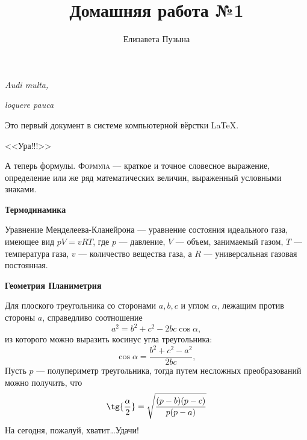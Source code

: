 \documentclass[12pt]{article}
\title{Домашняя работа №1}
\author{Елизавета Пузына}
\date{}
\begin{document}
	\maketitle
	\begin{flushright}

	\textit{Audi multa,}
	
	\textit{loquere pauca}

	\end{flushright}

	{\vspace{20pt}}Это первый документ в системе компьютерной вёрстки {\LaTeX}.
	
	\begin{center}
	\huge \textsf{<<Ура!!!>>}
	\end{center}
	
	А теперь формулы. {\textsc{Формула}} --- краткое и точное словесное выражение, определение или же ряд математических величин, выраженный условными знаками.
	
    {\vspace{15pt} \hspace{14pt} \bfseries \Large Термодинамика}
	
	Уравнение Менделеева-Кланейрона --- уравнение состояния идеального газа, имеющее вид ${pV = vRT}$, где ${p}$ --- давление, ${V}$ --- объем, занимаемый газом, ${T}$ --- температура газа, ${v}$ --- количество вещества газа, а ${R}$ --- универсальная газовая постоянная.
	
	{\vspace{15pt} \hspace{14pt} \bfseries \Large Геометрия \hfill \bfseries \Large Планиметрия}
	
    Для плоского треугольника со сторонами ${a, b, c}$ и углом ${\alpha}$, лежащим против стороны ${a}$, справедливо соотношение
	$$
	a^2 = b^2 + c^2 - 2bc {\cos{\alpha}},
	$$
	из которого можно выразить косинус угла треугольника:
	$$
	{\cos{\alpha}} = \frac{b^2 + c^2 - a^2}{2bc},
	$$
	Пусть ${p}$ --- полупериметр треугольника, тогда путем несложных преобразований можно получить, что
	$$
	{\tg {\frac{\alpha}{2}} = {\sqrt{\frac{(p-b)(p-c)}{p(p-a)}}}}
	$$
	{\vspace{1cm} \hspace{0pt}}На сегодня, пожалуй, хватит\dots Удачи!
\end{document}
